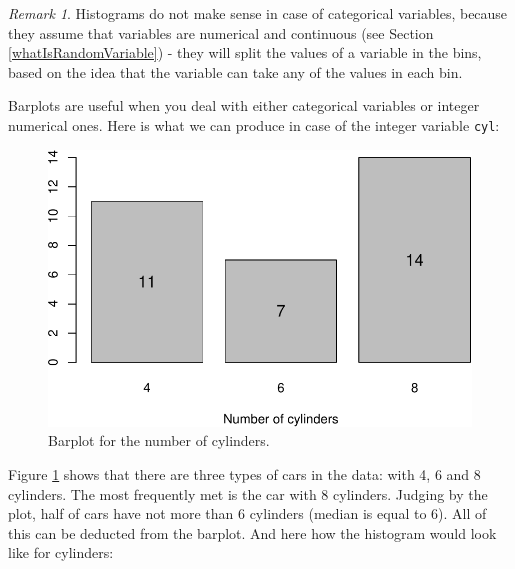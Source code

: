 \documentclass[
]{book}
\newenvironment{Shaded}{\begin{snugshade}}{\end{snugshade}}
\newcommand{\AttributeTok}[1]{\textcolor[rgb]{0.13,0.29,0.53}{#1}}
\newcommand{\DecValTok}[1]{\textcolor[rgb]{0.00,0.00,0.81}{#1}}
\newcommand{\FloatTok}[1]{\textcolor[rgb]{0.00,0.00,0.81}{#1}}
\newcommand{\FunctionTok}[1]{\textcolor[rgb]{0.13,0.29,0.53}{\textbf{#1}}}
\newcommand{\NormalTok}[1]{#1}
\newcommand{\OtherTok}[1]{\textcolor[rgb]{0.56,0.35,0.01}{#1}}
\newcommand{\SpecialCharTok}[1]{\textcolor[rgb]{0.81,0.36,0.00}{\textbf{#1}}}
\newcommand{\StringTok}[1]{\textcolor[rgb]{0.31,0.60,0.02}{#1}}
\theoremstyle{definition}
\theoremstyle{definition}
\theoremstyle{definition}
\theoremstyle{definition}
\theoremstyle{remark}
\newtheorem*{remark}{Remark}
\begin{document}
\begin{remark}
Histograms do not make sense in case of categorical variables, because they assume that variables are numerical and continuous (see Section \ref{whatIsRandomVariable}) - they will split the values of a variable in the bins, based on the idea that the variable can take any of the values in each bin.
\end{remark}

Barplots are useful when you deal with either categorical variables or integer numerical ones. Here is what we can produce in case of the integer variable \texttt{cyl}:

\begin{Shaded}
\end{Shaded}

\begin{figure}
\centering
\includegraphics{Svetunkov---Statistics-for-Business-Analytics_files/figure-latex/barplotCYL-1.pdf}
\caption{\label{fig:barplotCYL}Barplot for the number of cylinders.}
\end{figure}

Figure \ref{fig:barplotCYL} shows that there are three types of cars in the data: with 4, 6 and 8 cylinders. The most frequently met is the car with 8 cylinders. Judging by the plot, half of cars have not more than 6 cylinders (median is equal to 6). All of this can be deducted from the barplot. And here how the histogram would look like for cylinders:
\end{document}
